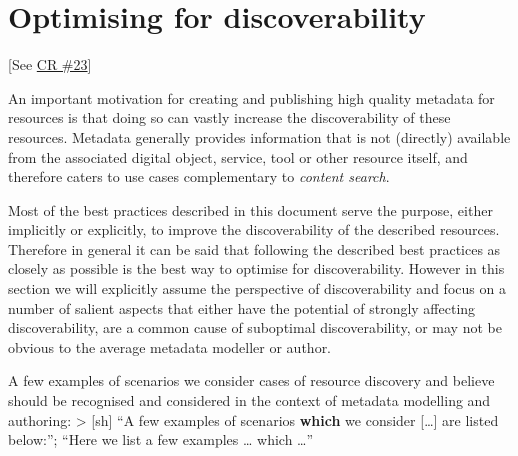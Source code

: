 \section{Optimising for
discoverability}\label{optimising-for-discoverability}

{[}See
\href{https://www.gitbook.com/book/cmdi-taskforce/cmdi-best-practices/changes/23}{CR
\#23}{]}

An important motivation for creating and publishing high quality
metadata for resources is that doing so can vastly increase the
discoverability of these resources. Metadata generally provides
information that is not (directly) available from the associated digital
object, service, tool or other resource itself, and therefore caters to
use cases complementary to \emph{content search}.

Most of the best practices described in this document serve the purpose,
either implicitly or explicitly, to improve the discoverability of the
described resources. Therefore in general it can be said that following
the described best practices as closely as possible is the best way to
optimise for discoverability. However in this section we will explicitly
assume the perspective of discoverability and focus on a number of
salient aspects that either have the potential of strongly affecting
discoverability, are a common cause of suboptimal discoverability, or
may not be obvious to the average metadata modeller or author.

A few examples of scenarios we consider cases of resource discovery and
believe should be recognised and considered in the context of metadata
modelling and authoring: \textgreater{} {[}sh{]} ``A few examples of
scenarios \textbf{which} we consider {[}\ldots{}{]} are listed below:'';
``Here we list a few examples \ldots{} which \ldots{}''

